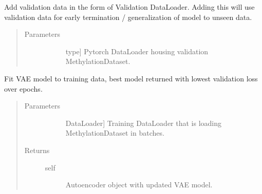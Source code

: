 \documentclass[letterpaper,10pt,english]{sphinxmanual}
\begin{document}
\begin{fulllineitems}
\begin{fulllineitems}
\label{\detokenize{index:methylnet.models.AutoEncoder.add_validation_set}}
Add validation data in the form of Validation DataLoader. Adding this will use validation data for early termination / generalization of model to unseen data.
\begin{quote}\begin{description}
\item[{Parameters}] \leavevmode\begin{description}
\item[{}] \leavevmode{[}type{]}
Pytorch DataLoader housing validation MethylationDataset.

\end{description}

\end{description}\end{quote}

\end{fulllineitems}


\begin{fulllineitems}
\label{\detokenize{index:methylnet.models.AutoEncoder.fit}}
Fit VAE model to training data, best model returned with lowest validation loss over epochs.
\begin{quote}\begin{description}
\item[{Parameters}] \leavevmode\begin{description}
\item[{}] \leavevmode{[}DataLoader{]}
Training DataLoader that is loading MethylationDataset in batches.

\end{description}

\item[{Returns}] \leavevmode\begin{description}
\item[{self}] \leavevmode
Autoencoder object with updated VAE model.

\end{description}


\end{description}
\end{quote}
\end{fulllineitems}
\end{fulllineitems}
\end{document}
